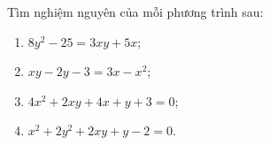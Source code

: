 \begin{bt}%
    Tìm nghiệm nguyên của mỗi phương trình sau:
    \begin{enumerate}
    \item $8y^2-25=3xy+5x$;
    \item $xy-2y-3=3x-x^2$;
    \item $4x^2+2xy+4x+y+3=0$;
    \item $x^2+2y^2+2xy+y-2=0$.
    \end{enumerate}
\end{bt}
